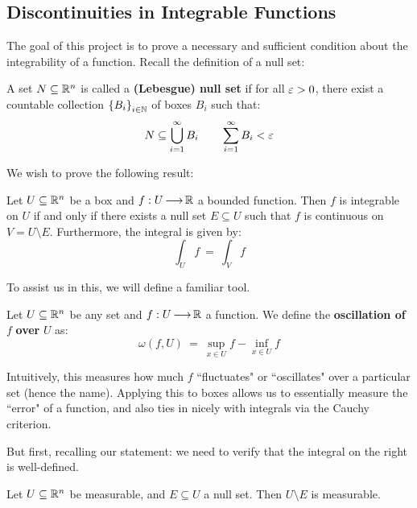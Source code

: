 \newpage
\subsection{Discontinuities in Integrable Functions}

The goal of this project is to prove a necessary and sufficient condition about
the integrability of a function. Recall the definition of a null set:
\begin{defn}
    A set $ N \subseteq \mathbb{R}^{n} $ is called a \textbf{(Lebesgue) null set} if
    for all $ \operatorname{\varepsilon} > 0 $, there exist a countable collection
    $ \left\{{B_{i}}\right\}_{i\in\mathbb{N}} $ of boxes $ B_{i} $ such that:
    \begin{equation*}
        N \subseteq \bigcup_{i=1}^{\infty}B_{i} \qquad
        \sum_{i=1}^{\infty}B_{i} < \operatorname{\varepsilon}
    \end{equation*}
\end{defn}
We wish to prove the following result:
\begin{thm}
    Let $ U \subseteq \mathbb{R}^{n} $ be a box and $ f: U \operatorname{\longrightarrow} \mathbb{R} $ a bounded
    function. \vsp
    Then $ f $ is integrable on $ U $ if and only if there exists a null set
    $ E \subseteq U $ such that $ f $ is continuous on $ V = U \setminus E $.
    Furthermore, the integral is given by:
    \begin{equation*}
        \int_{U}f \ = \ \int_{V}f
    \end{equation*}
\end{thm}

To assist us in this, we will define a familiar tool.
\begin{defn}
    Let $ U \subseteq \mathbb{R}^{n} $ be any set and $ f: U \operatorname{\longrightarrow} \mathbb{R} $ a function.
    We define the \textbf{oscillation of} $ f $ \textbf{over} $ U $ as:
    \begin{equation*}
        \omega(f, U) \ = \ \sup_{x \in U}f - \inf_{x \in U}f
    \end{equation*}
\end{defn}
Intuitively, this measures how much $ f $ ``fluctuates" or ``oscillates" over a
particular set (hence the name). Applying this to boxes allows us to essentially
measure the ``error" of a function, and also ties in nicely with integrals via
the Cauchy criterion.

But first, recalling our statement: we need to verify that the integral on the
right is well-defined.
\begin{lm}
    Let $ U \subseteq \mathbb{R}^{n} $ be measurable, and $ E \subseteq U $ a null set.
    Then $ U \setminus E $ is measurable.
\end{lm}

